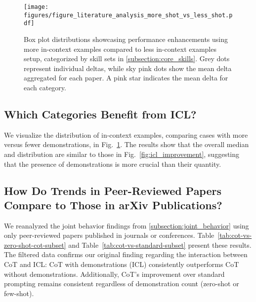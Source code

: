 \begin{figure}[t!]
    \centering
    \texttt{[image: figures/figure\_literature\_analysis\_more\_shot\_vs\_less\_shot.pdf]}
    \caption{Box plot distributions showcasing performance enhancements using more in-context examples compared to less in-context examples setup, categorized by skill sets in \cref{subsection:core_skills}. 
     Grey dots represent individual deltas, while sky pink dots show the mean delta aggregated for each paper. A pink star indicates the mean delta for each category.}
    \label{fig:icl_improvement_more_vs_less}
\end{figure}

\subsection{Which Categories Benefit from ICL?}

We visualize the distribution of in-context examples, comparing cases with more versus fewer demonstrations, in Fig.~\ref{fig:icl_improvement_more_vs_less}. 
The results show that the overall median and distribution are similar to those in Fig.~\ref{fig:icl_improvement}, suggesting that the presence of demonstrations is more crucial than their quantity.

\subsection{How Do Trends in Peer-Reviewed Papers Compare to Those in arXiv Publications?}

We reanalyzed the joint behavior findings from \cref{subsection:joint_behavior} using only peer-reviewed papers published in journals or conferences.
Table~\ref{tab:cot-vs-zero-shot-cot-subset} and Table~\ref{tab:cot-vs-standard-subset} present these results.
The filtered data confirms our original finding regarding the interaction between CoT and ICL: CoT with demonstrations (ICL) consistently outperforms CoT without demonstrations. Additionally, CoT's improvement over standard prompting remains consistent regardless of demonstration count (zero-shot or few-shot).